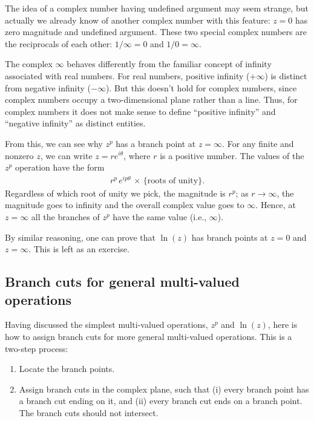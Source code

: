 \documentclass[10pt,a4paper]{article}
\begin{document}
The idea of a complex number having undefined argument may seem
strange, but actually we already know of another complex number with
this feature: $z = 0$ has zero magnitude and undefined argument.
These two special complex numbers are the reciprocals of each other:
$1/\infty = 0$ and $1/0 = \infty$.

The complex $\infty$ behaves differently from the familiar concept of
infinity associated with real numbers. For real numbers, positive
infinity ($+\infty$) is distinct from negative infinity
($-\infty$). But this doesn't hold for complex numbers, since complex
numbers occupy a two-dimensional plane rather than a line. Thus, for
complex numbers it does not make sense to define ``positive infinity''
and ``negative infinity'' as distinct entities.

From this, we can see why $z^p$ has a branch point at $z =
\infty$. For any finite and nonzero $z$, we can write $z =
re^{i\theta}$, where $r$ is a positive number. The values of the $z^p$
operation have the form
\begin{align}
  r^p \, e^{ip\theta}\,\times\, \{\text{roots of unity}\}.
\end{align}
Regardless of which root of unity we pick, the magnitude is $r^p$; as
$r \rightarrow \infty$, the magnitude goes to infinity and the overall
complex value goes to $\infty$. Hence, at $z = \infty$ all the
branches of $z^p$ have the same value (i.e., $\infty$).

By similar reasoning, one can prove that $\ln(z)$ has branch points at
$z = 0$ and $z = \infty$.  This is left as an exercise.

\subsection{Branch cuts for general multi-valued operations}
\label{branch-cuts-for-general-multi-valued-operations}

Having discussed the simplest multi-valued operations, $z^p$ and
$\ln(z)$, here is how to assign branch cuts for more general
multi-valued operations. This is a two-step process:

\begin{enumerate}
\item Locate the branch points.

\item Assign branch cuts in the complex plane, such that (i) every
  branch point has a branch cut ending on it, and (ii) every branch
  cut ends on a branch point. The branch cuts should not intersect.
\end{enumerate}
\end{document}
